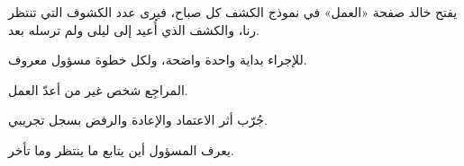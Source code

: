 \begin{rcnote}
يفتح خالد صفحة «العمل» في نموذج الكشف كل صباح، فيرى عدد الكشوف التي تنتظر رنا، والكشف الذي أُعيد إلى ليلى ولم ترسله بعد.
\end{rcnote}

\begin{rcchecklist}
\begin{checklist}
  \item للإجراء بداية واحدة واضحة، ولكل خطوة مسؤول معروف.
  \item المراجِع شخص غير من أعدّ العمل.
  \item جُرّب أثر الاعتماد والإعادة والرفض بسجل تجريبي.
  \item يعرف المسؤول أين يتابع ما ينتظر وما تأخر.
\end{checklist}
\end{rcchecklist}
